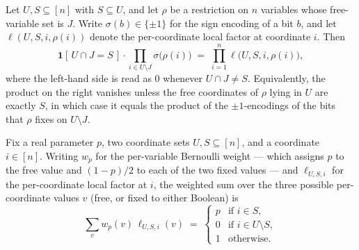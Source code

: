 \begin{lemma}
\label{RestrictionFourier.indicator_signProd_eq_prod}
\leanok
{}
Let $U, S \subseteq [n]$ with $S \subseteq U$, and let $\rho$ be a restriction on $n$
variables whose free-variable set is $J$. Write $\sigma(b) \in \{\pm1\}$ for the sign
encoding of a bit $b$, and let $\ell(U,S,i,\rho(i))$ denote the per-coordinate local
factor at coordinate $i$. Then
\[
\mathbf{1}[\,U \cap J = S\,]\cdot \prod_{i \in U \setminus J} \sigma\bigl(\rho(i)\bigr)
  \;=\; \prod_{i=1}^{n} \ell\bigl(U, S, i, \rho(i)\bigr),
\]
where the left-hand side is read as $0$ whenever $U \cap J \neq S$. Equivalently, the
product on the right vanishes unless the free coordinates of $\rho$ lying in $U$ are
exactly $S$, in which case it equals the product of the $\pm1$-encodings of the bits
that $\rho$ fixes on $U \setminus J$.
\end{lemma}

\begin{lemma}
\label{RestrictionFourier.sum_varWeight_localFactor}
\leanok
{}
Fix a real parameter $p$, two coordinate sets $U, S \subseteq [n]$, and a coordinate $i
\in [n]$. Writing $w_p$ for the per-variable Bernoulli weight — which assigns $p$ to the
free value and $(1-p)/2$ to each of the two fixed values — and $\ell_{U,S,i}$ for the
per-coordinate local factor at $i$, the weighted sum over the three possible
per-coordinate values $v$ (free, or fixed to either Boolean) is
\[
  \sum_{v} w_p(v)\,\ell_{U,S,i}(v)
  \;=\;
  \begin{cases}
    p & \text{if } i \in S,\\
    0 & \text{if } i \in U \setminus S,\\
    1 & \text{otherwise.}
  \end{cases}
\]
\end{lemma}


